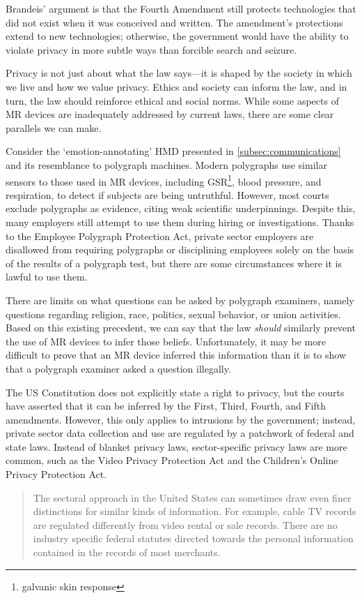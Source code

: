 Brandeis' argument is that the Fourth Amendment still protects technologies that did not exist when it was conceived and written. The amendment's protections extend to new technologies; otherwise, the government would have the ability to violate privacy in more subtle ways than forcible search and seizure.

Privacy is not just about what the law says---it is shaped by the society in which we live and how we value privacy. Ethics and society can inform the law, and in turn, the law should reinforce ethical and social norms. While some aspects of MR devices are inadequately addressed by current laws, there are some clear parallels we can make.

Consider the `emotion-annotating'  HMD presented in \autoref{subsec:communications} and its resemblance to polygraph machines. Modern polygraphs use similar sensors to those used in MR devices, including GSR\footnote{galvanic skin response}, blood pressure, and respiration, to detect if subjects are being untruthful. However, most courts exclude polygraphs as evidence, citing weak scientific underpinnings. Despite this, many employers still attempt to use them during hiring or investigations. Thanks to the Employee Polygraph Protection Act, private sector employers are disallowed from requiring polygraphs or disciplining employees solely on the basis of the results of a polygraph test, but there are some circumstances where it is lawful to use them.

There are limits on what questions can be asked by polygraph examiners, namely questions regarding religion, race, politics, sexual behavior, or union activities. Based on this existing precedent, we can say that the law \emph{should} similarly prevent the use of MR devices to infer those beliefs. Unfortunately, it may be more difficult to prove that an MR device inferred this information than it is to show that a polygraph examiner asked a question illegally.

The US Constitution does not explicitly state a right to privacy, but the courts have asserted that it can be inferred by the First, Third, Fourth, and Fifth amendments. However, this only applies to intrusions by the government; instead, private sector data collection and use are regulated by a patchwork of federal and state laws. Instead of blanket privacy laws, sector-specific privacy laws are more common, such as the Video Privacy Protection Act and the Children's Online Privacy Protection Act.

\begin{quote}
The sectoral approach in the United States can sometimes draw even finer distinctions for similar kinds of information. For example, cable TV records are regulated differently from video rental or sale records. There are no industry specific federal statutes directed towards the personal information contained in the records of most merchants.\cite{solove2018information}
\end{quote} 

